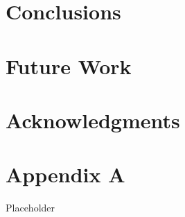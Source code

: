 \documentclass[12pt,oneside]{book}
\begin{document}
\chapter{Conclusions}
\label{chap:Conclusions}

\chapter{Future Work}
\label{chap:Future_Work}

\chapter{Acknowledgments}
\label{chap:Acknowledgments}



\appendix

\chapter{Appendix A}

Placeholder
\end{document}
